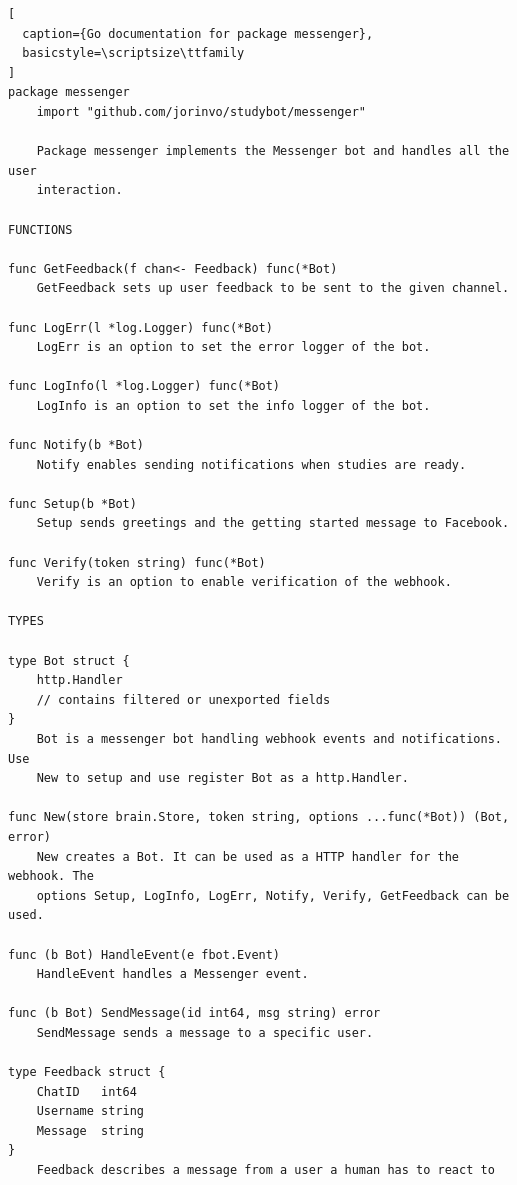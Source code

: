 \pagebreak
\begin{lstlisting}[
  caption={Go documentation for package messenger},
  basicstyle=\scriptsize\ttfamily
]
package messenger
    import "github.com/jorinvo/studybot/messenger"

    Package messenger implements the Messenger bot and handles all the user
    interaction.

FUNCTIONS

func GetFeedback(f chan<- Feedback) func(*Bot)
    GetFeedback sets up user feedback to be sent to the given channel.

func LogErr(l *log.Logger) func(*Bot)
    LogErr is an option to set the error logger of the bot.

func LogInfo(l *log.Logger) func(*Bot)
    LogInfo is an option to set the info logger of the bot.

func Notify(b *Bot)
    Notify enables sending notifications when studies are ready.

func Setup(b *Bot)
    Setup sends greetings and the getting started message to Facebook.

func Verify(token string) func(*Bot)
    Verify is an option to enable verification of the webhook.

TYPES

type Bot struct {
    http.Handler
    // contains filtered or unexported fields
}
    Bot is a messenger bot handling webhook events and notifications. Use
    New to setup and use register Bot as a http.Handler.

func New(store brain.Store, token string, options ...func(*Bot)) (Bot, error)
    New creates a Bot. It can be used as a HTTP handler for the webhook. The
    options Setup, LogInfo, LogErr, Notify, Verify, GetFeedback can be used.

func (b Bot) HandleEvent(e fbot.Event)
    HandleEvent handles a Messenger event.

func (b Bot) SendMessage(id int64, msg string) error
    SendMessage sends a message to a specific user.

type Feedback struct {
    ChatID   int64
    Username string
    Message  string
}
    Feedback describes a message from a user a human has to react to
\end{lstlisting}


